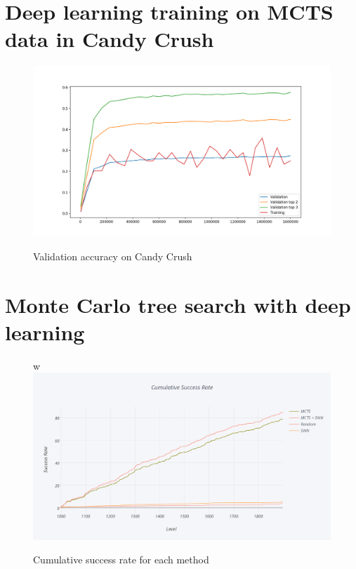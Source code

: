\documentclass{kththesis}
\begin{document}
\section{Deep learning training on MCTS data in Candy Crush}

\begin{figure}
\centering
\includegraphics[width=\textwidth]{images/candy_real_training.png}
\label{fig:candy_real_validation_accuracy}
\caption{Validation accuracy on Candy Crush}
\end{figure}

\section{Monte Carlo tree search with deep learning}

\begin{figure}
\centering
w\includegraphics[width=\textwidth]{images/cumulative_sr.png}
\label{fig:cumulative_sr}
\caption{Cumulative success rate for each method}
\end{figure}
\end{document}
